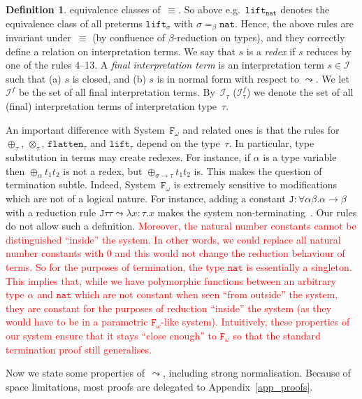 \documentclass[a4paper,UKenglish,cleveref,autoref,numberwithinsect]{lipics-v2019}
\theoremstyle{definition}
\newtheorem{defn}[theorem]{Definition}
\newcommand{\Fomega}{\mathtt{F}_\omega}
\newcommand{\Iterms}{\mathcal{I}}
\newcommand{\arrtype}{\rightarrow}
\newcommand{\arrW}{\leadsto}
\newcommand{\nat}{\mathtt{nat}}
\newcommand{\flatten}{\mathtt{flatten}}
\newcommand{\lift}{\mathtt{lift}}
\newcommand{\LCchange}[1]{\textcolor{red}{#1}}
\begin{document}
\begin{defn}
  equivalence classes of~$\equiv$. So above e.g.~$\lift_\nat$ denotes
  the equivalence class of all preterms $\lift_\sigma$ with
  $\sigma =_\beta \nat$. Hence, the above rules are invariant
  under~$\equiv$ (by confluence of $\beta$-reduction on types), and
  they correctly define a relation on interpretation terms. We say
  that $s$ is a \emph{redex} if $s$ reduces by one of the rules 4--13.
%
  A \emph{final interpretation term} is an interpretation term $s \in
  \Iterms$ such that (a) $s$ is closed, and (b) $s$ is in normal form
  with respect to $\arrW$.  We let $\Iterms^f$ be the set of all final
  interpretation terms. By~$\Iterms_\tau$ ($\Iterms^f_\tau$) we denote
  the set of all (final) interpretation terms of interpretation
  type~$\tau$.
\end{defn}

An important difference with System~$\Fomega$ and related ones is that
the rules for $\oplus_\tau$, $\otimes_\tau$, $\flatten_\tau$ and
$\lift_\tau$ depend on the type~$\tau$. In particular, type
substitution in terms may create redexes. For instance, if $\alpha$ is
a type variable then $\oplus_\alpha t_1 t_2$ is not a redex, but
$\oplus_{\sigma\arrtype\tau} t_1 t_2$ is. This makes the question of
termination subtle. Indeed, System~$\Fomega$ is extremely sensitive to
modifications which are not of a logical nature. For instance, adding
a constant $\mathtt{J} : \forall \alpha \beta . \alpha \arrtype \beta$
with a reduction rule
$\mathtt{J} \tau \tau \leadsto \lambda x : \tau . x$ makes the system
non-terminating~\cite{Girard1971}. Our rules do not allow such a
definition. \LCchange{Moreover, the natural number constants cannot be
  distinguished ``inside'' the system. In other words, we could
  replace all natural number constants with 0 and this would not
  change the reduction behaviour of terms. So for the purposes of
  termination, the type $\nat$ is essentially a singleton. This
  implies that, while we have polymorphic functions between an
  arbitrary type $\alpha$ and $\nat$ which are not constant when seen
  ``from outside'' the system, they are constant for the purposes of
  reduction ``inside'' the system (as they would have to be in a
  parametric $\Fomega$-like system). Intuitively, these properties of
  our system ensure that it stays ``close enough'' to $\Fomega$ so
  that the standard termination proof still generalises.}

Now we state some properties of~$\arrW$, including strong
normalisation. Because of space limitations, most proofs are
delegated to Appendix~\ref{app_proofs}.
\end{document}
